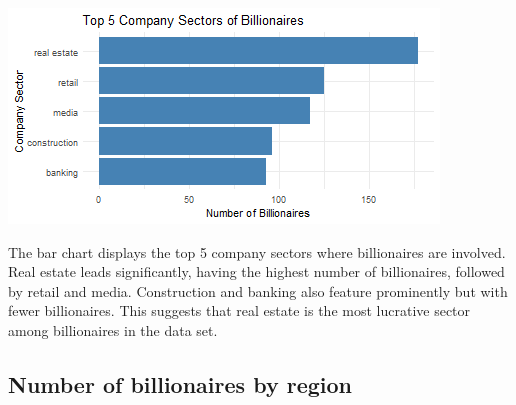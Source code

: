 \documentclass[11pt,preprint]{elsarticle}
\let\origfigure\figure
\let\endorigfigure\endfigure
\renewenvironment{figure}[1][2] {
    \expandafter\origfigure\expandafter[H]
} {
    \endorigfigure
}
\numberwithin{equation}{section}
\numberwithin{figure}{section}
\numberwithin{table}{section}
\begin{document}
\begin{figure}

{\centering \includegraphics{23084103_Billionaires_files/figure-latex/Figure 1a-1} 

}

\caption{Caption Here \label{Figure1}}\label{fig:Figure 1a}
\end{figure}

The bar chart displays the top 5 company sectors where billionaires are
involved. Real estate leads significantly, having the highest number of
billionaires, followed by retail and media. Construction and banking
also feature prominently but with fewer billionaires. This suggests that
real estate is the most lucrative sector among billionaires in the data
set.

\subsection{Number of billionaires by
region}\label{number-of-billionaires-by-region}

\begin{Shaded}
\begin{Highlighting}[]

\OtherTok{\textless{}{-}}\SpecialCharTok{\%\textgreater{}\%}
  \SpecialCharTok{\%\textgreater{}\%}
  \NormalTok{(} \NormalTok{()) }\SpecialCharTok{\%\textgreater{}\%}
    \NormalTok{(}
  

\NormalTok{(} \SpecialCharTok{+}
  \NormalTok{(} \NormalTok{, } \NormalTok{) }\SpecialCharTok{+}
  \NormalTok{() }\SpecialCharTok{+}
  \NormalTok{(}
     \NormalTok{,}
     \NormalTok{,}
     
\NormalTok{  ) }\SpecialCharTok{+}
  \NormalTok{()}
\end{Highlighting}
\end{Shaded}
\end{document}
